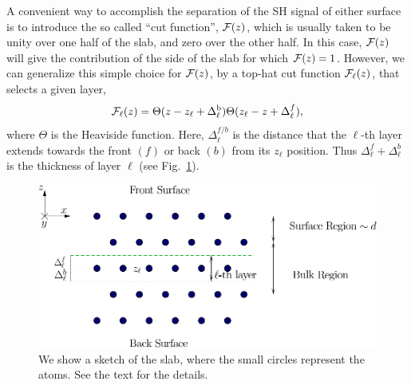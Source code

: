 \documentclass{article}
\begin{document}
A convenient way to accomplish the separation of the SH signal of
either surface is to introduce
the so called
``cut function'', ${\mathbf{\cal F}}(z)$, which is usually taken to be unity over one half
of the slab, and zero over the other half.
In this case, ${\mathbf{\cal F}}(z)$ will give the contribution of the side of the
slab for which ${\mathbf{\cal F}}(z)=1$. However, we can generalize this simple choice
for ${\mathbf{\cal F}}(z)$, 
by a top-hat cut function
${\mathbf{\cal F}}_\ell(z)$, that selects a given layer,
\begin{equation}
\label{sz}
{\mathbf{\cal F}}_\ell(z)=\Theta(z-z_\ell+\Delta_\ell^{\mathrm{b}})
            \Theta(z_\ell-z+\Delta_\ell^f),
\end{equation}
where $\Theta$ is the Heaviside function. Here, $\Delta_\ell^{f/b}$
is the distance that the $\ell$-th layer extends towards the front
$(f)$ or back $(b)$ from its $z_\ell$ position.  Thus
$\Delta_\ell^f+\Delta_\ell^b$ is the thickness of layer $\ell$
(see Fig.~\ref{fslab}).
\begin{figure}[b]
\centering
\includegraphics[scale=.7]{images/slab}
\caption{
We show a sketch of the slab, where the small
circles represent the atoms. See the text for the details.
}
\label{fslab}
\end{figure}
\end{document}
